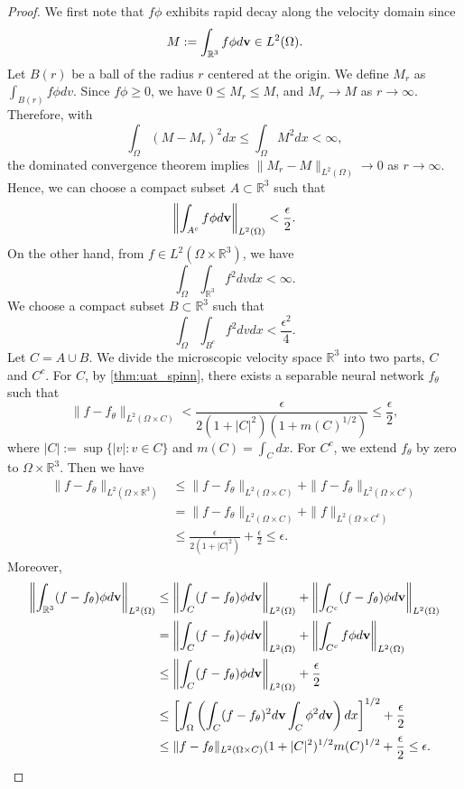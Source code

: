\documentclass[10pt,a4paper]{amsart}
\begin{document}
\begin{proof}
    We first note that $f\phi$ exhibits rapid decay along the velocity domain since
    \[
        M:= \int_{\mathbb{R}^3} f \phi d{\bf v} \in L^2(\Omega).
    \]
    Let \(B(r)\) be a ball of the radius \(r\) centered at the origin.
    We define $M_r$ as $\int_{B(r)} f\phi dv$.
    Since $f\phi \ge 0$, we have $0 \le M_r \le M$, and $M_r \rightarrow M$ as $r \rightarrow \infty$.
    Therefore, with
    \[
        \int_\Omega (M-M_r)^2 dx \le \int_\Omega M^2 dx < \infty,
    \]
    the dominated convergence theorem implies $\|M_r - M \|_{L^2(\Omega)} \rightarrow 0$ as $r \rightarrow \infty$.
    Hence, we can choose a compact subset $A \subset \mathbb{R}^3$ such that
    \[
        \left \| \int_{A^c} f \phi d{\bf v} \right\|_{L^2(\Omega)} < \frac{\epsilon}{2}.
    \]
    On the other hand, from $f \in L^2(\Omega \times \mathbb{R}^3)$, we have
    \[
        \int_\Omega\int_{\mathbb{R}^3} f^2 dv dx < \infty.
    \]
    We choose a compact subset $B \subset \mathbb{R}^3$ such that
    \[
        \int_\Omega \int_{B^c} f^2  dv dx < \frac{\epsilon^2}{4}.
    \]
    Let $C = A\cup B$.
    We divide the microscopic velocity space $\mathbb{R}^3$ into two parts, $C$ and $C^c$.
    For $C$, by \cref{thm:uat_spinn}, there exists a separable neural network $f_\theta$ such that 
    \[\| f - f_\theta \|_{L^2(\Omega \times C)} < \frac{\epsilon}{2(1+|C|^2)\left(1 + m(C)^{1/2}\right)} \le \frac{\epsilon}{2},\]
    where \(|C|:= \sup\{|v|: v \in C\}\) and \(m(C) = \int_C dx\).
    For $C^c$, we extend $f_\theta$ by zero to $\Omega \times \mathbb{R}^3$.
    Then we have
    \[
    \begin{split}
    \| f - f_\theta\|_{L^2(\Omega \times \mathbb{R}^3)}
    & \le \| f - f_\theta\|_{L^2(\Omega \times C)} + \| f - f_\theta \|_{L^2(\Omega \times C^c)} \\
    & = \| f - f_\theta\|_{L^2(\Omega \times C)} + \| f \|_{L^2(\Omega \times C^c)} \\
    & \le \frac{\epsilon}{2(1 + |C|^2)} + \frac{\epsilon}{2} \le \epsilon.
    \end{split}
    \]
    Moreover,
    \[
    \begin{split}
        \left\| \int_{\mathbb{R}^3} (f - f_\theta) \phi d{\bf v} \right\|_{L^2(\Omega)}
        & \le \left \| \int_C (f-f_\theta)\phi d{\bf v}\right \|_{L^2(\Omega)}
        + \left \| \int_{C^c} (f-f_\theta)\phi d{\bf v}\right \|_{L^2(\Omega)} \\
        & = \left \| \int_C (f-f_\theta)\phi d{\bf v}\right \|_{L^2(\Omega)}
        + \left \| \int_{C^c} f\phi d{\bf v}\right \|_{L^2(\Omega)} \\
        & \le \left \| \int_C (f-f_\theta)\phi d{\bf v}\right \|_{L^2(\Omega)} + \frac{\epsilon}{2} \\
        & \le  \left[\int_\Omega \left(\int_C (f-f_\theta)^2d{\bf v}\int_C \phi^2 d{\bf v}\right) dx\right]^{1/2} + \frac{\epsilon}{2} \\ 
        & \le \| f-f_\theta\|_{L^2(\Omega\times C)}(1+|C|^2)^{1/2}m(C)^{1/2} + \frac{\epsilon}{2}
        \le \epsilon.
    \end{split}
    \]
\end{proof}
\end{document}
